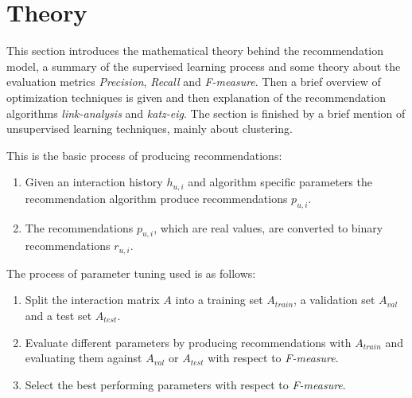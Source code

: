 
\section{Theory}\label{sec:theory}

This section introduces the mathematical theory behind the recommendation model, a summary of the supervised learning process and some theory about the evaluation metrics \textit{Precision}, \textit{Recall} and \textit{F-measure}. Then a brief overview of optimization techniques is given and then explanation of the recommendation algorithms \textit{link-analysis} and \textit{katz-eig}. The section is finished by a brief mention of unsupervised learning techniques, mainly about clustering.


This is the basic process of producing recommendations:

\begin{enumerate}
    \item Given an interaction history $h_{u, i}$ and algorithm specific parameters the recommendation algorithm produce recommendations $p_{u, i}$.
    \item The recommendations $p_{u, i}$, which are real values, are converted to binary recommendations $r_{u, i}$.
\end{enumerate}

The process of parameter tuning used is as follows:

\begin{enumerate}
    \item Split the interaction matrix $A$ into a training set $A_{train}$, a validation set $A_{val}$ and a test set $A_{test}$.
    \item Evaluate different parameters by producing recommendations with $A_{train}$ and evaluating them against $A_{val}$ or $A_{test}$ with respect to \textit{F-measure}.
    \item Select the best performing parameters with respect to \textit{F-measure}.
\end{enumerate}












